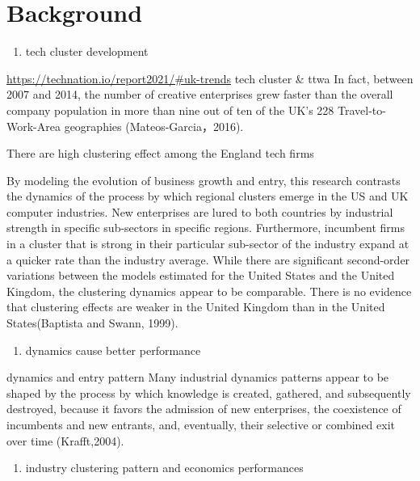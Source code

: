 \documentclass[
  12pt,
  oneside]{book}
\providecommand{\tightlist}{%
  \setlength{\itemsep}{0pt}\setlength{\parskip}{0pt}}
\begin{document}

\hypertarget{background}{%
\section{Background}\label{background}}

\begin{enumerate}
\def\labelenumi{\arabic{enumi}.}
\tightlist
\item
  tech cluster development
\end{enumerate}

\url{https://technation.io/report2021/\#uk-trends}
tech cluster \& ttwa
In fact, between 2007 and 2014, the number of creative enterprises grew faster than the overall company population in more than nine out of ten of the UK's 228 Travel-to-Work-Area geographies (Mateos-Garcia，2016).

There are high clustering effect among the England tech firms

By modeling the evolution of business growth and entry, this research contrasts the dynamics of the process by which regional clusters emerge in the US and UK computer industries. New enterprises are lured to both countries by industrial strength in specific sub-sectors in specific regions. Furthermore, incumbent firms in a cluster that is strong in their particular sub-sector of the industry expand at a quicker rate than the industry average. While there are significant second-order variations between the models estimated for the United States and the United Kingdom, the clustering dynamics appear to be comparable. There is no evidence that clustering effects are weaker in the United Kingdom than in the United States(Baptista and Swann, 1999).

\begin{enumerate}
\def\labelenumi{\arabic{enumi}.}
\setcounter{enumi}{1}
\tightlist
\item
  dynamics cause better performance
\end{enumerate}

dynamics and entry pattern
Many industrial dynamics patterns appear to be shaped by the process by which knowledge is created, gathered, and subsequently destroyed, because it favors the admission of new enterprises, the coexistence of incumbents and new entrants, and, eventually, their selective or combined exit over time (Krafft,2004).

\begin{enumerate}
\def\labelenumi{\arabic{enumi}.}
\setcounter{enumi}{2}
\tightlist
\item
  industry clustering pattern and economics performances
\end{enumerate}
\end{document}
